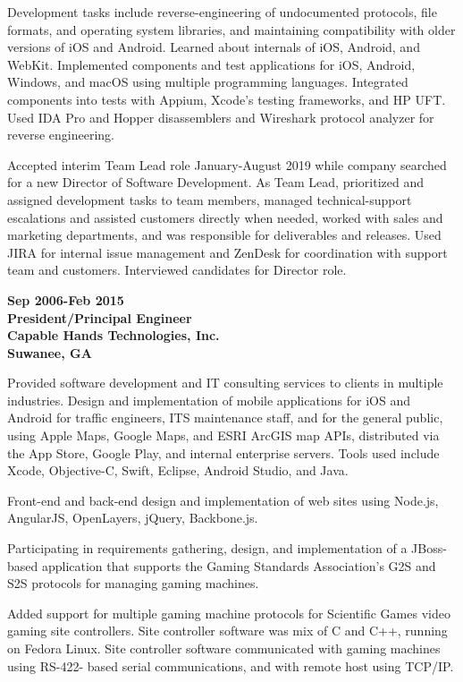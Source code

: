 Development tasks include reverse-engineering of undocumented protocols,
file formats, and operating system libraries, and maintaining
compatibility with older versions of iOS and Android. Learned about
internals of iOS, Android, and WebKit. Implemented components and test
applications for iOS, Android, Windows, and macOS using multiple
programming languages. Integrated components into tests with Appium,
Xcode's testing frameworks, and HP UFT. Used IDA Pro and Hopper
disassemblers and Wireshark protocol analyzer for reverse engineering.

Accepted interim Team Lead role January-August 2019 while company
searched for a new Director of Software Development. As Team Lead,
prioritized and assigned development tasks to team members, managed
technical-support escalations and assisted customers directly when
needed, worked with sales and marketing departments, and was responsible
for deliverables and releases. Used JIRA for internal issue management
and ZenDesk for coordination with support team and customers.
Interviewed candidates for Director role.

\textbf{Sep 2006-Feb 2015\\
President/Principal Engineer\\
Capable Hands Technologies, Inc.\\
Suwanee, GA}

Provided software development and IT consulting services to clients in
multiple industries. Design and implementation of mobile applications
for iOS and Android for traffic engineers, ITS maintenance staff, and
for the general public, using Apple Maps, Google Maps, and ESRI ArcGIS
map APIs, distributed via the App Store, Google Play, and internal
enterprise servers. Tools used include Xcode, Objective-C, Swift,
Eclipse, Android Studio, and Java.

Front-end and back-end design and implementation of web sites using
Node.js, AngularJS, OpenLayers, jQuery, Backbone.js.

Participating in requirements gathering, design, and implementation of a
JBoss-based application that supports the Gaming Standards Association's
G2S and S2S protocols for managing gaming machines.

Added support for multiple gaming machine protocols for Scientific Games
video gaming site controllers. Site controller software was mix of C and
C++, running on Fedora Linux. Site controller software communicated with
gaming machines using RS-422- based serial communications, and with
remote host using TCP/IP.

